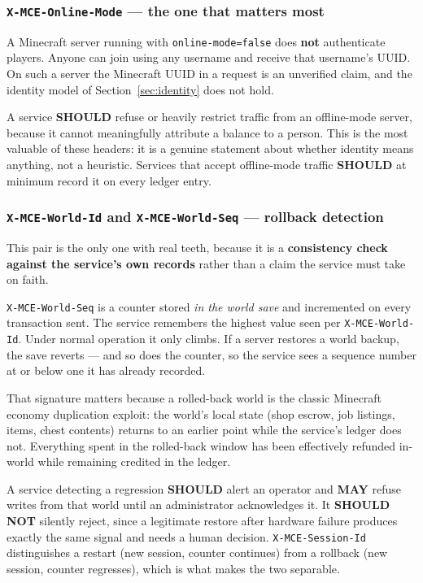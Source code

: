 \documentclass[11pt,a4paper]{article}
\newcommand{\code}[1]{\texttt{\small #1}}
\newcommand{\rec}{\textbf{SHOULD}}
\newcommand{\opt}{\textbf{MAY}}
\newcommand{\keybox}[2]{%
  \par\vspace{0.5em}\noindent
  \colorbox{#1}{%
    \begin{minipage}{\dimexpr\linewidth-2\fboxsep\relax}
    \vspace{0.35em}\small #2\vspace{0.35em}
    \end{minipage}}%
  \par\vspace{0.5em}}
\newcommand{\note}[1]{\keybox{omceWash}{#1}}
\newcommand{\warn}[1]{\keybox{omceWarnWash}{#1}}
\begin{document}
\subsubsection*{\code{X-MCE-Online-Mode} --- the one that matters most}

\warn{A Minecraft server running with \code{online-mode=false} does \textbf{not} authenticate
players. Anyone can join using any username and receive that username's UUID. On such a server the
Minecraft UUID in a request is an unverified claim, and the identity model of
Section~\ref{sec:identity} does not hold.}

A service \rec{} refuse or heavily restrict traffic from an offline-mode server, because it cannot
meaningfully attribute a balance to a person. This is the most valuable of these headers: it is a
genuine statement about whether identity means anything, not a heuristic. Services that accept
offline-mode traffic \rec{} at minimum record it on every ledger entry.

\subsubsection*{\code{X-MCE-World-Id} and \code{X-MCE-World-Seq} --- rollback detection}

This pair is the only one with real teeth, because it is a \textbf{consistency check against the
service's own records} rather than a claim the service must take on faith.

\code{X-MCE-World-Seq} is a counter stored \emph{in the world save} and incremented on every
transaction sent. The service remembers the highest value seen per \code{X-MCE-World-Id}. Under
normal operation it only climbs. If a server restores a world backup, the save reverts --- and so
does the counter, so the service sees a sequence number at or below one it has already recorded.

\note{That signature matters because a rolled-back world is the classic Minecraft economy
duplication exploit: the world's local state (shop escrow, job listings, items, chest contents)
returns to an earlier point while the service's ledger does not. Everything spent in the rolled-back
window has been effectively refunded in-world while remaining credited in the ledger.}

A service detecting a regression \rec{} alert an operator and \opt{} refuse writes from that world
until an administrator acknowledges it. It \textbf{SHOULD NOT} silently reject, since a legitimate
restore after hardware failure produces exactly the same signal and needs a human decision.
\code{X-MCE-Session-Id} distinguishes a restart (new session, counter continues) from a rollback
(new session, counter regresses), which is what makes the two separable.
\end{document}
